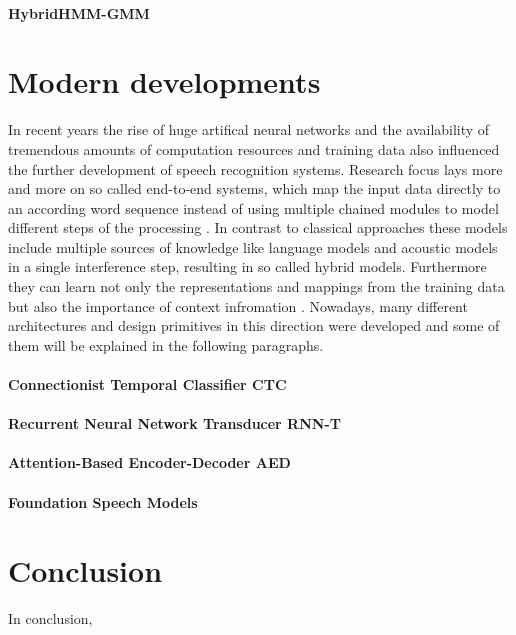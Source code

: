 \paragraph{HybridHMM-GMM}


\section{Modern developments}
In recent years the rise of huge artifical neural networks and the availability of tremendous amounts of computation resources and training data also influenced the further development of speech recognition systems.
Research focus lays more and more on so called end-to-end systems, which map the input data directly to an according word sequence instead of using multiple chained modules to model different steps of the processing \cite{history}.
In contrast to classical approaches these models include multiple sources of knowledge like language models and acoustic models in a single interference step, resulting in so called hybrid models.
Furthermore they can learn not only the representations and mappings from the training data but also the importance of context infromation \cite{joy2025approaches}. 
Nowadays, many different architectures and design primitives in this direction were developed and some of them will be explained in the following paragraphs.

\paragraph{Connectionist Temporal Classifier CTC}

\paragraph{Recurrent Neural Network Transducer RNN-T}

\paragraph{Attention-Based Encoder-Decoder AED}

\paragraph{Foundation Speech Models}

\section{Conclusion}
In conclusion,

